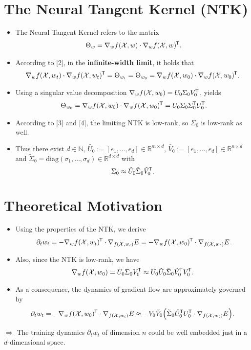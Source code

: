 \documentclass[t]{beamer}
\renewcommand{\N}{\mathbb{N}}
\renewcommand{\R}{\mathbb{R}}
\newcommand{\X}{\mathcal{X}}
\renewcommand*{\tr}{^{\mkern-1.5mu\mathsf{T}}}
\begin{document}
\section{The Neural Tangent Kernel (NTK)}
\begin{frame}
\begin{itemize}
\item The Neural Tangent Kernel refers to the matrix
\[ \Theta_{w} = \nabla_wf(\X,w) \cdot \nabla_wf(\X,w)\tr. \]
\item According to [2], in the \textbf{infinite-width limit}, it holds that
\[ \nabla_wf(\X,w_t) \cdot \nabla_wf(\X,w_t)\tr = \Theta_{w_t} = \Theta_{w_0} = \nabla_wf(\X,w_0) \cdot \nabla_wf(\X,w_0)\tr. \] 
\item Using a singular value decomposition $\nabla_wf(\X,w_0) = U_0 \Sigma_0 V_0\tr$, yields
\[ \Theta_{w_0} = \nabla_wf(\X,w_0) \cdot \nabla_wf(\X,w_0)\tr  = U_0 \Sigma_0 \Sigma_0\tr  U_0\tr. \]
\item According to [3] and [4], the limiting NTK is low-rank, so $\Sigma_0$ is low-rank as well. \vspace{0.2cm}
\item Thus there exist $d \in \N$, $\tilde{U_0} := [e_1, \dots, e_d] \in \R^{m\times d}$, $\tilde{V_0} := [e_1, \dots, e_d] \in \R^{n\times d}$ and $\tilde{\Sigma}_0 = \text{diag}(\sigma_1, \dots, \sigma_d) \in \R^{d \times d}$ with
\[ \Sigma_0 \approx \tilde{U}_0 \tilde{\Sigma}_0 \tilde{V}_0\tr. \]
\end{itemize}
\end{frame}



\section{Theoretical Motivation}
\begin{frame}
 \vspace{1cm}
\begin{itemize}
\item Using the properties of the NTK, we derive
\[ \partial_tw_t = - \nabla_w f(\X, w_t)\tr \cdot \nabla_{f(\X,w_t)} E = - \nabla_w f(\X, w_0)\tr \cdot \nabla_{f(\X,w_t)} E. \]
\item Also, since the NTK is low-rank, we have
\[ \nabla_wf(\X,w_0) = U_0 \Sigma_0 V_0\tr \approx U_0 \tilde{U}_0 \tilde{\Sigma}_0 \tilde{V}_0\tr  V_0\tr . \]
\item As a consequence, the dynamics of gradient flow are approximately governed by
\[ \partial_t w_t = -\nabla_wf(\X,w_0)\tr  \cdot \nabla_{f(\X,w_t)} E \approx - V_0 \tilde{V}_0 \Big ( \tilde{\Sigma}_0 \tilde{U}_0\tr  U_0\tr  \cdot \nabla_{f(\X,w_t)} E \Big ). \]
\end{itemize}
\vspace{1cm}
$\Rightarrow$ The training dynamics $\partial_tw_t$ of dimension $n$ could be well embedded just in a $d$-dimensional space.
\end{frame}
\end{document}
